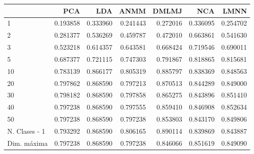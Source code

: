 \begin{tabular}{lrrrrrr}
\toprule
{} &       PCA &       LDA &      ANMM &     DMLMJ &       NCA &      LMNN \\
\midrule
1             &  0.193858 &  0.333960 &  0.241443 &  0.272016 &  0.336095 &  0.254702 \\
2             &  0.281377 &  0.536269 &  0.459787 &  0.472010 &  0.663861 &  0.541630 \\
3             &  0.523218 &  0.614357 &  0.643581 &  0.668424 &  0.719546 &  0.690011 \\
5             &  0.687377 &  0.721115 &  0.747303 &  0.791867 &  0.818865 &  0.815681 \\
10            &  0.783139 &  0.866177 &  0.805319 &  0.885797 &  0.838369 &  0.848563 \\
20            &  0.797862 &  0.868590 &  0.797213 &  0.870513 &  0.844289 &  0.849000 \\
30            &  0.798182 &  0.868590 &  0.797858 &  0.865275 &  0.843896 &  0.851410 \\
40            &  0.797238 &  0.868590 &  0.797555 &  0.859410 &  0.846908 &  0.852634 \\
50            &  0.797238 &  0.868590 &  0.797238 &  0.853803 &  0.843170 &  0.849806 \\
N. Clases - 1 &  0.793292 &  0.868590 &  0.806165 &  0.890114 &  0.839869 &  0.843887 \\
Dim. máxima   &  0.797238 &  0.868590 &  0.797238 &  0.846066 &  0.851619 &  0.849090 \\
\bottomrule
\end{tabular}
